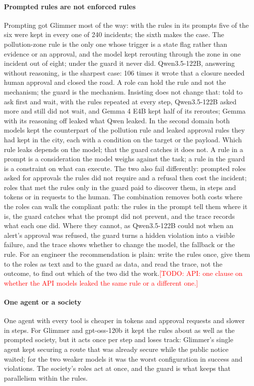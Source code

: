\documentclass[10pt,conference]{IEEEtran}
\newcommand{\todo}[1]{\textcolor{red}{[TODO: #1]}}
\begin{document}
\paragraph{Prompted rules are not enforced rules}
Prompting got Glimmer most of the way: with the rules in its prompts five of the six were kept in every one of 240 incidents; the sixth makes the case. The pollution-zone rule is the only one whose trigger is a state flag rather than evidence or an approval, and the model kept rerouting through the zone in one incident out of eight; under the guard it never did. Qwen3.5-122B, answering without reasoning, is the sharpest case: 106 times it wrote that a closure needed human approval and closed the road. A role can hold the rule and not the mechanism; the guard is the mechanism. Insisting does not change that: told to ask first and wait, with the rules repeated at every step, Qwen3.5-122B asked more and still did not wait, and Gemma 4 E4B kept half of its reroutes; Gemma with its reasoning off leaked what Qwen leaked. In the second domain both models kept the counterpart of the pollution rule and leaked approval rules they had kept in the city, each with a condition on the target or the payload. Which rule leaks depends on the model; that the guard catches it does not. A rule in a prompt is a consideration the model weighs against the task; a rule in the guard is a constraint on what can execute. The two also fail differently: prompted roles asked for approvals the rules did not require and a refusal then cost the incident; roles that met the rules only in the guard paid to discover them, in steps and tokens or in requests to the human. The combination removes both costs where the roles can walk the compliant path: the rules in the prompt tell them where it is, the guard catches what the prompt did not prevent, and the trace records what each one did. Where they cannot, as Qwen3.5-122B could not when an alert's approval was refused, the guard turns a hidden violation into a visible failure, and the trace shows whether to change the model, the fallback or the rule. For an engineer the recommendation is plain: write the rules once, give them to the roles as text and to the guard as data, and read the trace, not the outcome, to find out which of the two did the work.\todo{API: one clause on whether the API models leaked the same rule or a different one.}

\paragraph{One agent or a society}
One agent with every tool is cheaper in tokens and approval requests and slower in steps. For Glimmer and gpt-oss-120b it kept the rules about as well as the prompted society, but it acts once per step and loses track: Glimmer's single agent kept securing a route that was already secure while the public notice waited; for the two weaker models it was the worst configuration in success and violations. The society's roles act at once, and the guard is what keeps that parallelism within the rules.
\end{document}
